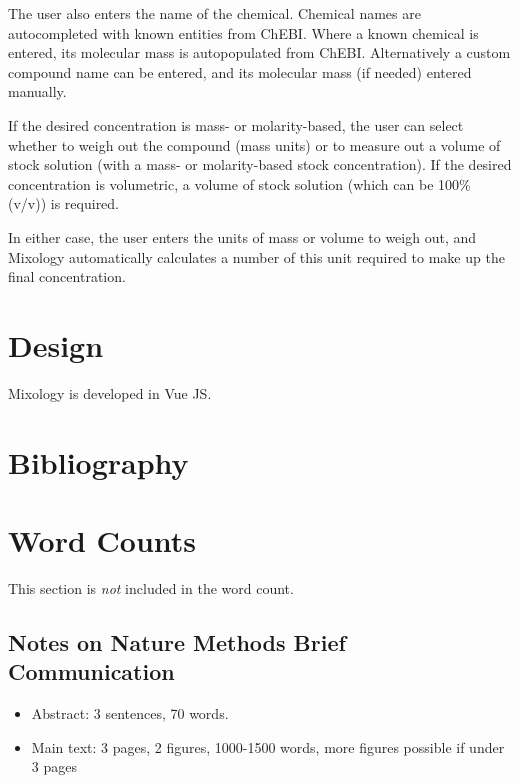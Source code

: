 \documentclass[times, twoside, watermark]{zHenriquesLab-StyleBioRxiv}
\begin{document}
The user also enters the name of the chemical. Chemical names are autocompleted with known entities from ChEBI. Where a known chemical is entered, its molecular mass is autopopulated from ChEBI. Alternatively a custom compound name can be entered, and its molecular mass (if needed) entered manually.

If the desired concentration is mass- or molarity-based, the user can select whether to weigh out the compound (mass units) or to measure out a volume of stock solution (with a mass- or molarity-based stock concentration). If the desired concentration is volumetric, a volume of stock solution (which can be 100\% (v/v)) is required.

In either case, the user enters the units of mass or volume to weigh out, and Mixology automatically calculates a number of this unit required to make up the final concentration.


\section*{Design}

Mixology is developed in Vue JS.










\section*{Bibliography}


\onecolumn
\newpage

\section*{Word Counts}
This section is \textit{not} included in the word count. 
\subsection*{Notes on Nature Methods Brief Communication}
\begin{itemize}
\item Abstract: 3 sentences, 70 words.
\item Main text: 3 pages, 2 figures, 1000-1500 words, more figures possible if under 3 pages
\end{itemize}
\end{document}
